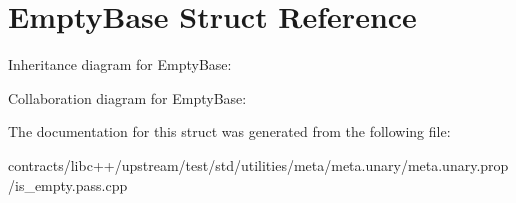 \hypertarget{struct_empty_base}{}\section{Empty\+Base Struct Reference}
\label{struct_empty_base}


Inheritance diagram for Empty\+Base\+:


Collaboration diagram for Empty\+Base\+:


The documentation for this struct was generated from the following file\+:\begin{DoxyCompactItemize}
\item 
contracts/libc++/upstream/test/std/utilities/meta/meta.\+unary/meta.\+unary.\+prop/is\+\_\+empty.\+pass.\+cpp\end{DoxyCompactItemize}
